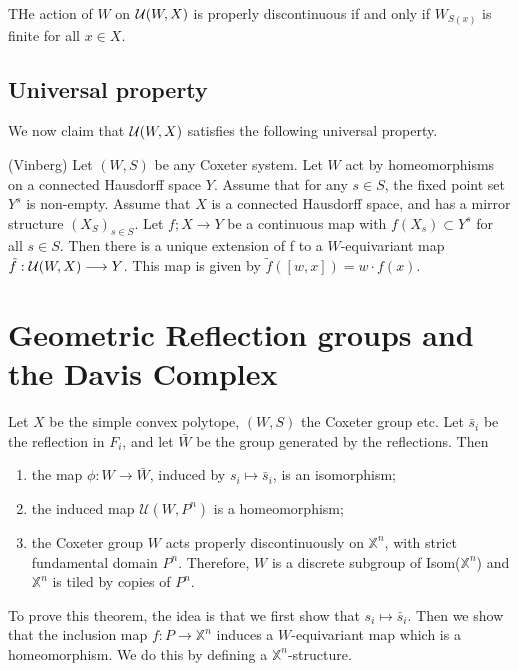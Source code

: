 \documentclass[11pt]{article}
\begin{document}
\begin{lemma}
    THe action of $W$ on $\mathcal{U}(W,X)$ is properly discontinuous if and only if $W_{S(x)}$ is finite for all $x\in X$. 
\end{lemma}

\subsection{Universal property}

We now claim that $\mathcal{U}(W,X)$ satisfies the following universal property.

\begin{theorem}
    (Vinberg) Let $(W,S)$ be any Coxeter system. Let $W$ act by homeomorphisms on a connected Hausdorff space $Y$. Assume that for any $s\in S$, the fixed point set $Y^s$ is non-empty. Assume that $X$ is a connected Hausdorff space, and has a mirror structure $(X_S)_{s\in S}$. Let $f;X\longrightarrow Y$ be a continuous map with $f(X_s)\subset Y^s$ for all $s\in S$. Then there is a unique extension of f to a $W$-equivariant map $\tilde{f}:\mathcal{U}(W,X) \longrightarrow Y$. This map is given by $\tilde{f}([w,x])=w\cdot f(x)$. 
\end{theorem}

\section{Geometric Reflection groups and the Davis Complex}
\begin{theorem}
    Let $X$ be the simple convex polytope, $(W,S)$ the Coxeter group etc. Let $\bar{s}_i$ be the reflection in $F_i$, and let $\bar{W}$ be the group generated by the reflections. Then 
    \begin{enumerate}
        \item the map $\phi: W\longrightarrow\bar{W}$, induced by $s_i\mapsto \bar{s}_i$, is an isomorphism;
        \item the induced map $\mathcal{U}(W,P^n)$ is a homeomorphism;
        \item the Coxeter group $W$ acts properly discontinuously on $\mathbb{X}^n$, with strict fundamental domain $P^n$. Therefore, $W$ is a discrete subgroup of Isom($\mathbb{X}^n$) and $\mathbb{X}^n$ is tiled by copies of $P^n$. 
    \end{enumerate}

\end{theorem}

To prove this theorem, the idea is that we first show that $s_i\mapsto \bar{s}_i$. Then we show that the inclusion map $f: P\longrightarrow \mathbb{X}^n$ induces a $W$-equivariant map which is a homeomorphism. We do this by defining a $\mathbb{X}^n$-structure.
\end{document}
